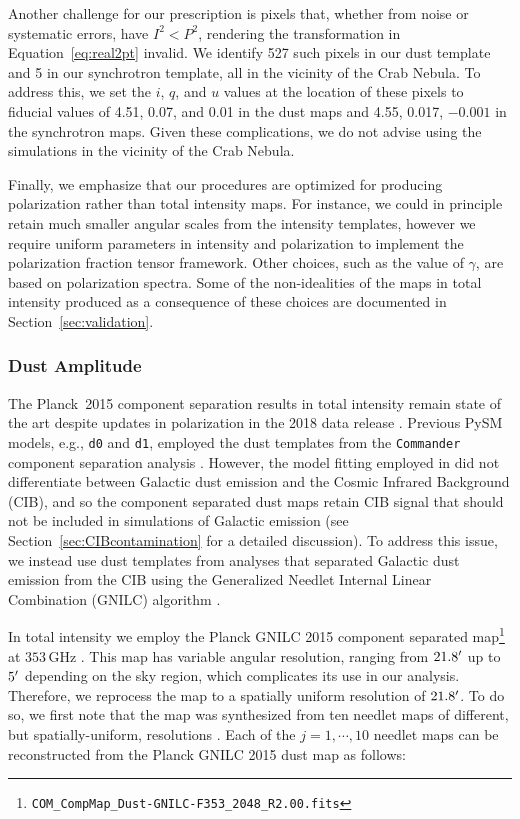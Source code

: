 \documentclass[twocolumn]{aastex631}
\begin{document}
Another challenge for our prescription is pixels that, whether from noise or systematic errors, have $I^2 < P^2$, rendering the transformation in Equation~\eqref{eq:real2pt} invalid. We identify 527 such pixels in our dust template and 5 in our synchrotron template, all in the vicinity of the Crab Nebula. To address this, we set the $i$, $q$, and $u$ values at the location of these pixels to fiducial values of 4.51, 0.07, and 0.01 in the dust maps and 4.55, 0.017, $-0.001$ in the synchrotron maps. Given these complications, we do not advise using the simulations in the vicinity of the Crab Nebula.

Finally, we emphasize that our procedures are optimized for producing polarization rather than total intensity maps. For instance, we could in principle retain much smaller angular scales from the intensity templates, however we require uniform parameters in intensity and polarization to implement the polarization fraction tensor framework. Other choices, such as the value of $\gamma$, are based on polarization spectra. Some of the non-idealities of the maps in total intensity produced as a consequence of these choices are documented in Section~\ref{sec:validation}.

\subsubsection{Dust Amplitude}\label{sec:dustamplitude}
The Planck~2015 component separation results in total intensity remain state of the art despite updates in polarization in the 2018 data release \citep{planck2016-l04}. Previous PySM models, e.g., \texttt{d0} and \texttt{d1}, employed the dust templates from the \texttt{Commander} component separation analysis \citep{planck2014-a11}. However, the model fitting employed in \citet{planck2014-a11} did not differentiate between Galactic dust emission and the Cosmic Infrared Background (CIB), and so the component separated dust maps retain CIB signal that should not be included in simulations of Galactic emission (see Section~\ref{sec:CIBcontamination} for a detailed discussion). To address this issue, we instead use dust templates from analyses that separated Galactic dust emission from the CIB using the Generalized Needlet Internal Linear Combination (GNILC) algorithm \citep{Remazeilles:2011}. 

In total intensity we employ the Planck GNILC 2015 component separated map\footnote{\texttt{COM\_CompMap\_Dust-GNILC-F353\_2048\_R2.00.fits}} at $353$\,GHz \citep{planck2016-XLVIII}. This map has variable angular resolution, ranging from $21.8\mbox{$^\prime$}$ up to $5\mbox{$^\prime$}$ depending on the sky region, which complicates its use in our analysis. Therefore, we reprocess the map to a spatially uniform resolution of $21.8\mbox{$^\prime$}$. To do so, we first note that the map was synthesized from ten needlet maps of different, but spatially-uniform, resolutions \citep[][Figure~A.2]{planck2016-XLVIII}. Each of the $j=1,\cdots,10$ needlet maps can be reconstructed from the Planck GNILC 2015 dust map as follows:
\end{document}
